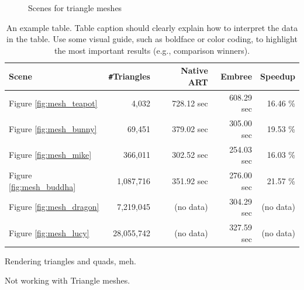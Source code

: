 \begin{figure}
	\hfill
	
	\caption{Scenes for triangle meshes}
	\label{fig:mesh_scenes}
\end{figure}

\begin{table}
	\centering
	{\footnotesize\sf
		\begin{tabular}{lrrrr}
			\toprule
			Scene & \Verb!#!Triangles & Native ART & Embree & Speedup \\ 
			\midrule
			Figure \ref{fig:mesh_teapot} & 4,032 & 728.12 sec & 608.29 sec & 16.46 \% \\
			Figure \ref{fig:mesh_bunny} & 69,451 & 379.02 sec & 305.00 sec & 19.53 \% \\
			Figure \ref{fig:mesh_mike} & 366,011 & 302.52 sec & 254.03 sec & 16.03 \%  \\
			\addlinespace %
			Figure \ref{fig:mesh_buddha} & 1,087,716 & 351.92 sec & 276.00 sec & 21.57 \% \\
			Figure \ref{fig:mesh_dragon} & 7,219,045 & (no data) & 304.29 sec & (no data)  \\
			Figure \ref{fig:mesh_lucy} & 28,055,742 & (no data) & 327.59 sec & (no data)  \\
			\bottomrule
	\end{tabular}}
	\caption{An example table. Table caption should clearly explain how to interpret the data in the table. Use some visual guide, such as boldface or color coding, to highlight the most important results (e.g., comparison winners).}
	\label{tab:mesh}
\end{table}






Rendering triangles and quads, meh.

Not working with Triangle meshes.

